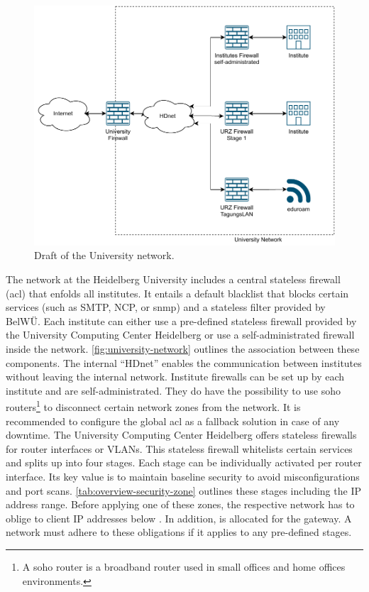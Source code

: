 \begin{figure}[ht]
    \centering
    \includegraphics[width=\textwidth]{figures/university-network.pdf}
    \caption[Draft of the University network]{
        Draft of the University network.
    }
    \label{fig:university-network}
\end{figure}

The network at the Heidelberg University includes a central stateless firewall (\ac{acl}) that enfolds all institutes.
It entails a default blacklist that blocks certain services (such as SMTP, NCP, or \ac{snmp}) and a stateless filter provided by BelWÜ.
Each institute can either use a pre-defined stateless firewall provided by the University Computing Center Heidelberg or use a self-administrated firewall inside the network.
\autoref{fig:university-network} outlines the association between these components.
The internal \enquote{HDnet} enables the communication between institutes without leaving the internal network.
Institute firewalls can be set up by each institute and are self-administrated.
They do have the possibility to use \acs{soho} routers\footnote{A \acl{soho} router is a broadband router used in small offices and home offices environments.} to disconnect certain network zones from the network.
It is recommended to configure the global \ac{acl} as a fallback solution in case of any downtime.
The University Computing Center Heidelberg offers stateless firewalls for router interfaces or VLANs.
This stateless firewall whitelists certain services and splits up into four stages.
Each stage can be individually activated per router interface.
Its key value is to maintain baseline security to avoid misconfigurations and port scans.
\autoref{tab:overview-security-zone} outlines these stages including the IP address range.
Before applying one of these zones, the respective network has to oblige to client IP addresses below .
In addition,  is allocated for the gateway.
A network must adhere to these obligations if it applies to any pre-defined stages.

